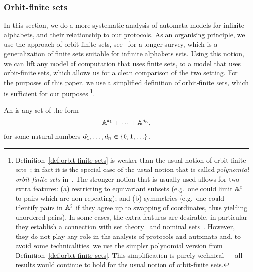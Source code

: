 \subsubsection{Orbit-finite sets}
\label{sec:orbit-finite-sets}
\AP
In this section, we do a more systematic analysis of automata models for
infinite alphabets, and their relationship to our protocols. As an organising
principle, we use the approach of orbit-finite sets,
see~\cite{bojanczykOrbitFiniteSetsTheir2017} for a longer survey, which is a
generalization of finite sets suitable for infinite alphabets sets. Using this
notion, we can lift any model of computation that uses finite sets, to a model
that uses orbit-finite sets, which allows us for a clean comparison of the two
setting. For the purposes of this paper, we use a simplified definition of
orbit-finite sets, which is sufficient for our purposes
\footnote{
Definition~\ref{def:orbit-finite-sets} is weaker than the usual notion of orbit-finite sets~\cite[Section 5]{bojanczyk_slightly}; in fact it is the special case of the usual notion that is called \emph{polynomial orbit-finite sets} in~\cite[Section 1]{bojanczyk_slightly}.
The stronger  notion that is usually used  allows for two extra features: (a) restricting to equivariant subsets (e.g.~one could limit $\mathbb A^2$ to pairs which are non-repeating); and (b)  symmetries (e.g.~one could identify pairs in $\mathbb A^2$ if they agree up to swapping of coordinates, thus yielding unordered pairs). In some cases, the extra features are desirable, in particular they establish a connection with set theory~\cite{blassDedekind2016} and  nominal sets~\cite[Section 5]{PittsAM:nomsns}. However, they do not play any role in the analysis of protocols and automata and, to avoid some technicalities, we use the simpler polynomial version from Definition~\ref{def:orbit-finite-sets}. This simplification is purely technical --- all results would continue to hold for the usual notion of orbit-finite sets.
}.
\begin{definition} \label{def:orbit-finite-sets}
  \AP
  An  is any set of the form 
    \begin{align*}
    \mathbb A^{d_1} + \cdots + \mathbb A^{d_n},
    \end{align*}
    for some natural numbers $d_1,\ldots,d_n \in \{0,1,\ldots\}$. 
\end{definition}

